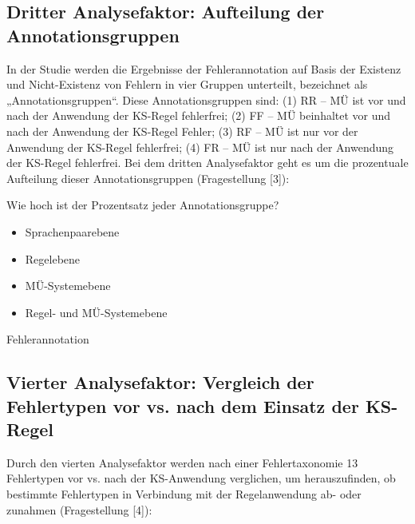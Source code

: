 \subsection*{Dritter Analysefaktor: Aufteilung der Annotationsgruppen}

In der Studie werden die Ergebnisse der Fehlerannotation auf Basis der Existenz und Nicht-Existenz von Fehlern in vier Gruppen unterteilt, bezeichnet als „Annotationsgruppen“. Diese Annotationsgruppen sind: (1) RR – MÜ ist vor und nach der Anwendung der KS-Regel fehlerfrei; (2) FF – MÜ beinhaltet vor und nach der Anwendung der KS-Regel Fehler; (3) RF – MÜ ist nur vor der Anwendung der KS-Regel fehlerfrei; (4) FR – MÜ ist nur nach der Anwendung der KS-Regel fehlerfrei. Bei dem dritten Analysefaktor geht es um die prozentuale Aufteilung dieser Annotationsgruppen (Fragestellung [3]):

\begin{description}[font=\normalfont\bfseries]
\item [Fragestellung] Wie hoch ist der Prozentsatz jeder Annotationsgruppe?
\item [Analyseebene]\hfill
  \begin{itemize}
  \item Sprachenpaarebene
  \item Regelebene
  \item MÜ-Systemebene
  \item Regel- und MÜ-Systemebene
  \end{itemize}
\item [Analysemethode] Fehlerannotation
\end{description}


\subsection*{Vierter Analysefaktor: Vergleich der Fehlertypen vor vs. nach dem Einsatz der KS-Regel}

Durch den vierten Analysefaktor werden nach einer Fehlertaxonomie 13 Fehlertypen vor vs. nach der KS-Anwendung verglichen, um herauszufinden, ob bestimmte Fehlertypen in Verbindung mit der Regelanwendung ab- oder zunahmen (Fragestellung [4]):

